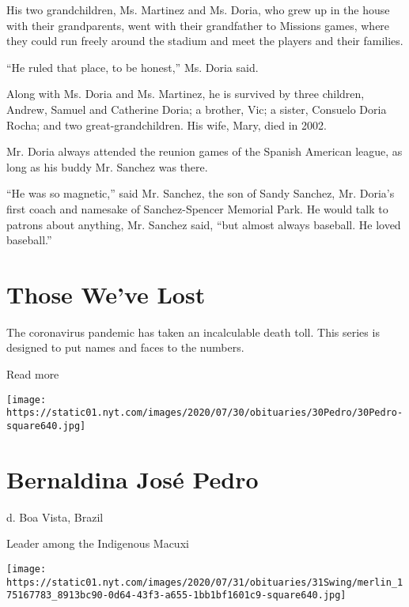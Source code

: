 His two grandchildren, Ms. Martinez and Ms. Doria, who grew up in the
house with their grandparents, went with their grandfather to Missions
games, where they could run freely around the stadium and meet the
players and their families.

``He ruled that place, to be honest,'' Ms. Doria said.

Along with Ms. Doria and Ms. Martinez, he is survived by three children,
Andrew, Samuel and Catherine Doria; a brother, Vic; a sister, Consuelo
Doria Rocha; and two great-grandchildren. His wife, Mary, died in 2002.

Mr. Doria always attended the reunion games of the Spanish American
league, as long as his buddy Mr. Sanchez was there.

``He was so magnetic,'' said Mr. Sanchez, the son of Sandy Sanchez, Mr.
Doria's first coach and namesake of Sanchez-Spencer Memorial Park. He
would talk to patrons about anything, Mr. Sanchez said, ``but almost
always baseball. He loved baseball.''

\href{https://www.nytimes.com/interactive/2020/obituaries/people-died-coronavirus-obituaries.html?action=click\&pgtype=Article\&state=default\&region=BELOW_MAIN_CONTENT\&context=covid_obits_promo}{}

\hypertarget{those-weve-lost}{%
\section{Those We've Lost}\label{those-weve-lost}}

The coronavirus pandemic has taken an incalculable death toll. This
series is designed to put names and faces to the numbers.

Read more

\texttt{[image: https://static01.nyt.com/images/2020/07/30/obituaries/30Pedro/30Pedro-square640.jpg]}

\hypertarget{bernaldina-josuxe9-pedro}{%
\section{Bernaldina José Pedro}\label{bernaldina-josuxe9-pedro}}

d. Boa Vista, Brazil

Leader among the Indigenous Macuxi

\texttt{[image: https://static01.nyt.com/images/2020/07/31/obituaries/31Swing/merlin\_175167783\_8913bc90-0d64-43f3-a655-1bb1bf1601c9-square640.jpg]}

